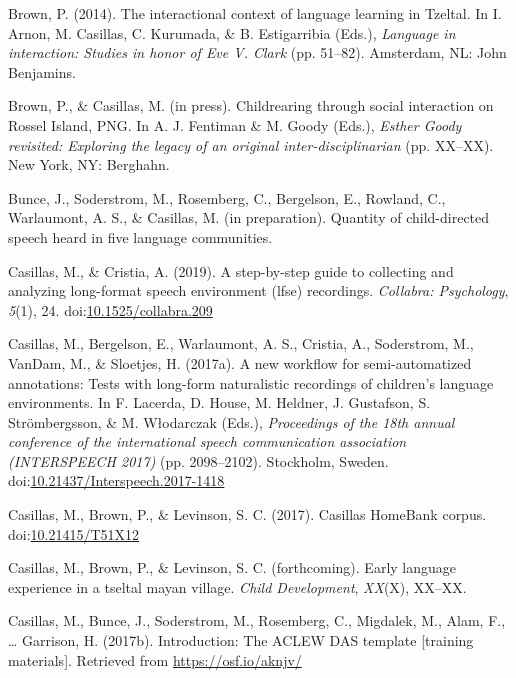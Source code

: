 \documentclass[,man,floatsintext]{apa6}
\begin{document}
\hypertarget{ref-brown2014interactional}{}
Brown, P. (2014). The interactional context of language learning in
Tzeltal. In I. Arnon, M. Casillas, C. Kurumada, \& B. Estigarribia
(Eds.), \emph{Language in interaction: Studies in honor of Eve V. Clark}
(pp. 51--82). Amsterdam, NL: John Benjamins.

\hypertarget{ref-brownIPchildrearing}{}
Brown, P., \& Casillas, M. (in press). Childrearing through social
interaction on Rossel Island, PNG. In A. J. Fentiman \& M. Goody (Eds.),
\emph{Esther Goody revisited: Exploring the legacy of an original
inter-disciplinarian} (pp. XX--XX). New York, NY: Berghahn.

\hypertarget{ref-bunceIPCDS}{}
Bunce, J., Soderstrom, M., Rosemberg, C., Bergelson, E., Rowland, C.,
Warlaumont, A. S., \& Casillas, M. (in preparation). Quantity of
child-directed speech heard in five language communities.

\hypertarget{ref-casillas2019stepbystep}{}
Casillas, M., \& Cristia, A. (2019). A step-by-step guide to collecting
and analyzing long-format speech environment (lfse) recordings.
\emph{Collabra: Psychology}, \emph{5}(1), 24.
doi:\href{https://doi.org/10.1525/collabra.209}{10.1525/collabra.209}

\hypertarget{ref-casillas2017workflow}{}
Casillas, M., Bergelson, E., Warlaumont, A. S., Cristia, A., Soderstrom,
M., VanDam, M., \& Sloetjes, H. (2017a). A new workflow for
semi-automatized annotations: Tests with long-form naturalistic
recordings of children's language environments. In F. Lacerda, D. House,
M. Heldner, J. Gustafson, S. Strömbergsson, \& M. Włodarczak (Eds.),
\emph{Proceedings of the 18th annual conference of the international
speech communication association (INTERSPEECH 2017)} (pp. 2098--2102).
Stockholm, Sweden.
doi:\href{https://doi.org/10.21437/Interspeech.2017-1418}{10.21437/Interspeech.2017-1418}

\hypertarget{ref-Casillas-HB}{}
Casillas, M., Brown, P., \& Levinson, S. C. (2017). Casillas HomeBank
corpus. doi:\href{https://doi.org/10.21415/T51X12}{10.21415/T51X12}

\hypertarget{ref-casillasFCearly}{}
Casillas, M., Brown, P., \& Levinson, S. C. (forthcoming). Early
language experience in a tseltal mayan village. \emph{Child
Development}, \emph{XX}(X), XX--XX.

\hypertarget{ref-casillas2017ACLEWDAS}{}
Casillas, M., Bunce, J., Soderstrom, M., Rosemberg, C., Migdalek, M.,
Alam, F., \ldots{} Garrison, H. (2017b). Introduction: The ACLEW DAS
template {[}training materials{]}. Retrieved from
\url{https://osf.io/aknjv/}
\end{document}
